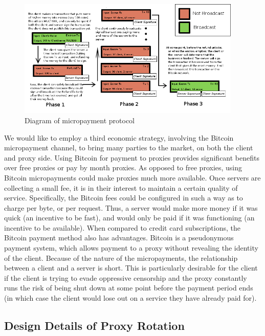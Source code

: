 \begin{figure}
  \centering
  \includegraphics[width=0.95\textwidth]{microtransactions.png}
  \caption{Diagram of micropayment protocol}
  \label{fig:micropayment-protocol}
\end{figure}

We would like to employ a third economic strategy, involving the Bitcoin micropayment channel, to bring many parties to the market, on both the client and proxy side. Using Bitcoin for payment to proxies provides significant benefits over free proxies or pay by month proxies. As opposed to free proxies, using Bitcoin micropayments could make proxies much more available. Once servers are collecting a small fee, it is in their interest to maintain a certain quality of service. Specifically, the Bitcoin fees could be configured in such a way as to charge per byte, or per request. Thus, a server would make more money if it was quick (an incentive to be fast), and would only be paid if it was functioning (an incentive to be available). When compared to credit card subscriptions, the Bitcoin payment method also has advantages. Bitcoin is a pseudonymous payment system, which allows payment to a proxy without revealing the identity of the client. 
Because of the nature of the micropayments, the relationship between a client and a server is short. This is particularly desirable for the client if the client is trying to evade oppressive censorship and the proxy constantly runs the risk of being shut down at some point before the payment period ends (in which case the client would lose out on a service they have already paid for).

\subsection{Design Details of Proxy Rotation}

